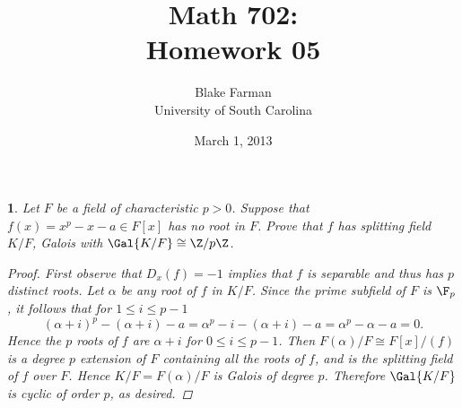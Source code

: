 \documentclass[10pt]{amsart}
\author{Blake Farman\\University of South Carolina}
\title{Math 702:\\Homework 05}
\date{March 1, 2013}
\begin{document}
\maketitle

\providecommand{\p}{\mathfrak{p}}
\providecommand{\m}{\mathfrak{m}}

\newtheorem{thm}{}
\newtheorem{lem}{Lemma}

\newcommand{\End}[2]{\operatorname{End}_{#1}\left(#2\right)}
\newcommand{\Hom}[2]{\operatorname{Hom}_{#1}\left(#2\right)}

\begin{thm}
  Let $F$ be a field of characteristic $p > 0$.
  Suppose that $f(x) = x^p - x - a \in F[x]$ has no root in $F$.
  Prove that $f$ has splitting field $K/F$, Galois with $\Gal{K/F} \cong \Z/p\Z$.

  \begin{proof}
    First observe that $D_x(f) = -1$ implies that $f$ is separable and thus has $p$ distinct roots.
    Let $\alpha$ be any root of $f$ in $K/F$.
    Since the prime subfield of $F$ is $\F_p$, it follows that for $1 \leq i \leq p-1$
    $$(\alpha + i)^p - (\alpha + i) - a = \alpha^p - i - (\alpha + i) - a = \alpha^p - \alpha - a = 0.$$
    Hence the $p$ roots of $f$ are $\alpha + i$ for $0 \leq i \leq p-1$.
    Then $F(\alpha)/F \cong F[x]/(f)$ is a degree $p$ extension of $F$ containing all the roots of $f$, and is the splitting field of $f$ over $F$.
    Hence $K/F = F(\alpha)/F$ is Galois of degree $p$.
    Therefore $\Gal{K/F}$ is cyclic of order $p$, as desired.
  \end{proof}
\end{thm}
\end{document}
